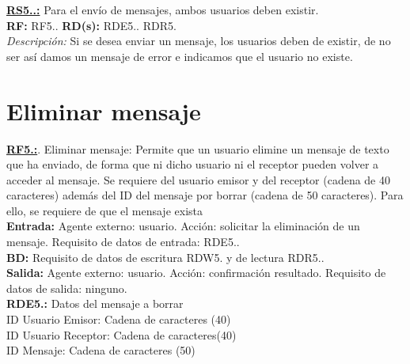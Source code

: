 \textbf{\textcolor{verde}{\underline{RS5.\theRF.\theRS:}}} Para el envío de mensajes, ambos usuarios deben existir. \\
\textbf{RF:} RF5.\theRF. \textbf{RD(s):} RDE5.\theRDE. RDR5.\theRDR \\
\hspace*{1cm} \textit{Descripción:} Si se desea enviar un mensaje, los usuarios deben de existir, de no ser así damos un mensaje de error e indicamos que el usuario no existe. \\ [6pt]


\section{Eliminar mensaje}
\textbf{\textcolor{rojo}{\underline{RF5.\theRF:}}}. Eliminar mensaje: Permite que un usuario elimine un mensaje de texto que ha enviado, de forma que ni dicho usuario ni el receptor pueden volver a acceder al mensaje. Se requiere del usuario emisor y del receptor (cadena de 40 caracteres) además del ID del mensaje por borrar (cadena de 50 caracteres). Para ello, se requiere de que el mensaje exista\\[6pt]

\textbf{\textcolor{rojo}{Entrada:}} Agente externo: usuario. Acción: solicitar la eliminación de un mensaje. 
Requisito de datos de entrada: \textcolor{azul}{RDE5.\theRDE.}\\[6pt]

\textbf{\textcolor{rojo}{BD:}} Requisito de datos de escritura \textcolor{azul}{RDW5.\theRDW} y de lectura \textcolor{azul}{RDR5.\theRDR}. \\[6pt]

\textbf{\textcolor{rojo}{Salida:}} Agente externo: usuario. Acción: confirmación resultado. 
Requisito de datos de salida: ninguno. \\[12pt]

\textcolor{azul}{\textbf{RDE5.\theRDE:}} Datos del mensaje a borrar\\
\hspace*{1cm} ID Usuario Emisor: Cadena de caracteres (40) \\
\hspace*{1cm} ID Usuario Receptor: Cadena de caracteres(40) \\
\hspace*{1cm} ID Mensaje: Cadena de caracteres (50) \\[12pt]

